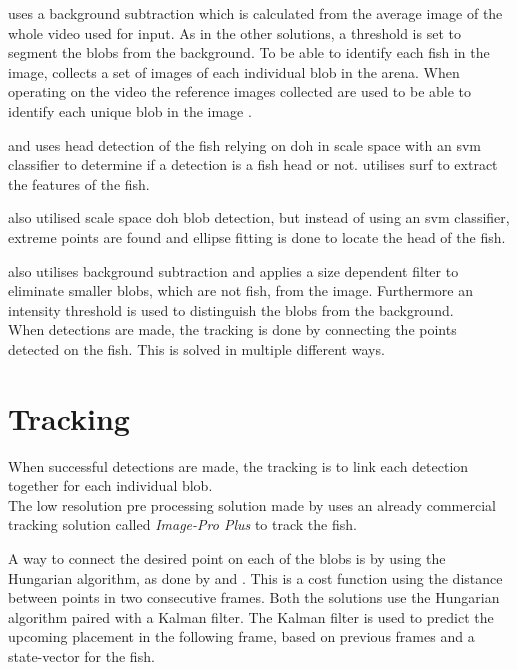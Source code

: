 \cite{idtracker2014} uses a background subtraction which is calculated from the average image of the whole video used for input. As in the other solutions, a threshold is set to segment the \gls{blob}s from the background. To be able to identify each fish in the image, \cite{idtracker2014} collects a set of images of each individual \gls{blob} in the arena. When operating on the video the reference images collected are used to be able to identify each unique \gls{blob} in the image \citep{idtracker2014}.

\cite{Wang2017} and \cite{Pedersen2017} uses head detection of the fish relying on \gls{doh} in scale space with an \gls{svm} classifier to determine if a detection is a fish head or not. \cite{Pedersen2017} utilises \gls{surf} to extract the features of the fish.

\cite{Qian2014} also utilised scale space \gls{doh} \gls{blob} detection, but instead of using an \gls{svm} classifier, extreme points are found and ellipse fitting is done to locate the head of the fish.

\cite{Romero-Ferrero2019} also utilises background subtraction and applies a size dependent filter to eliminate smaller \gls{blob}s, which are not fish, from the image. Furthermore an intensity threshold is used to distinguish the \gls{blob}s from the background.\\

When detections are made, the tracking is done by connecting the points detected on the fish. This is solved in multiple different ways.

\section{Tracking}
When successful detections are made, the tracking is to link each detection together for each individual \gls{blob}.\\


The low resolution pre processing solution made by \cite{Dolado2015} uses an already commercial tracking solution called \textit{Image-Pro Plus} to track the fish.

A way to connect the desired point on each of the \gls{blob}s is by using the Hungarian algorithm, as done by \cite{Rodriguez2017} and \cite{Pedersen2017}. This is a cost function using the distance between points in two consecutive frames. Both the solutions use the Hungarian algorithm paired with a Kalman filter. The Kalman filter is used to predict the upcoming placement in the following frame, based on previous frames and a state-vector for the fish.


